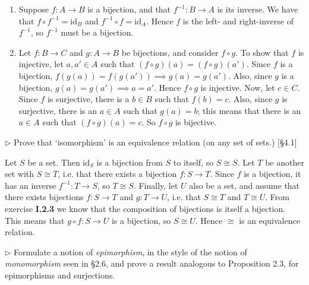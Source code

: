 \documentclass[12pt,letterpaper,boxed]{hmcpset}
\newcommand{\id}{\mathrm{id}}
\begin{document}
\begin{enumerate}
	\item Suppose $f:A\to B$ is a bijection, and that $f^{-1}:B\to A$ is its inverse.
	We have that $f\circ f^{-1} = \id_B$ and $f^{-1}\circ f = \id_A$. Hence $f$ is
	the left- and right-inverse of $f^{-1}$, so $f^{-1}$ must be a bijection.
	
	\item Let $f:B\to C$ and $g:A\to B$ be bijections, and consider $f\circ g$. To
	show that $f$ is injective, let $a, a'\in A$ such that $(f\circ g)(a) = (f\circ
	g)(a')$. Since $f$ is a bijection, $f(g(a)) = f(g(a')) \implies g(a) = g(a')$.
	Also, since $g$ is a bijection, $g(a) = g(a') \implies a=a'$. Hence $f\circ g$
	is injective. Now, let $c\in C$. Since $f$ is surjective, there is a $b\in B$
	such that $f(b) = c$. Also, since $g$ is surjective, there is an $a\in A$ such
	that $g(a) = b$; this means that there is an $a\in A$ such that $(f\circ g)(a) =
	c$. So $f\circ g$ is bijective.
\end{enumerate}


\begin{problem}[2.4]
	$\rhd$ Prove that `isomorphism' is an equivalence relation (on any set
	of sets.) [\S4.1]
\end{problem}

\begin{solution}
	Let $S$ be a set. Then $\id_S$ is a bijection from $S$ to itself, so $S\cong S$.
	Let $T$ be another set with $S\cong T$, i.e. that there exists a bijection
	$f:S\to T$. Since $f$ is a bijection, it has an inverse $f^{-1}:T\to S$, so
	$T\cong S$. Finally, let $U$ also be a set, and assume that there exists
	bijections $f:S\to T$ and $g:T\to U$, i.e. that $S\cong T$ and $T\cong U$. From
	exercise \textbf{I.2.3} we know that the composition of bijections is itself a
	bijection. This means that $g\circ f: S\to U$ is a bijection, so $S\cong U$.
	Hence $\cong$ is an equivalence relation.
\end{solution}


\begin{problem}[2.5]
	$\rhd$ Formulate a notion of \textit{epimorphism}, in the style
	of the notion of \textit{monomorphism} seen in \S 2.6, and prove a result
	analogous to Proposition 2.3, for epimorphisms and surjections.
\end{problem}
\end{document}
